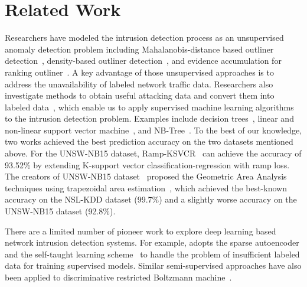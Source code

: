 \section{Related Work}
Researchers have modeled the intrusion detection process as an unsupervised
anomaly detection problem including Mahalanobis-distance based outliner detection~\cite{ComparativeAnomalyNIDS},
density-based outliner detection~\cite{LOF}, and evidence accumulation for ranking outliner~\cite{RankingOutliner}.
A key advantage of those unsupervised approaches is to address the unavailability of labeled network traffic data.
Researchers also investigate methods to obtain useful attacking data and convert them into labeled data~\cite{KDDCup, NSL-KDD, UNSW},
which enable us to apply supervised machine learning algorithms to the intrusion detection problem.
Examples include decision trees~\cite{DecisionTree}, linear and non-linear support vector machine~\cite{SVM},
and NB-Tree~\cite{NB-Tree}. To the best of our knowledge, two works achieved the best prediction accuracy on the two datasets mentioned above.
For the UNSW-NB15 dataset, Ramp-KSVCR~\cite{RampLossKSVCR} can achieve the accuracy of 93.52\% by extending K-support vector classification-regression with ramp loss. 
The creators of UNSW-NB15 dataset~\cite{UNSW} proposed the Geometric Area Analysis techniques using trapezoidal area estimation~\cite{GAA-ADS},
which achieved the best-known accuracy on the NSL-KDD dataset (99.7\%) and
a slightly worse accuracy on the UNSW-NB15 dataset (92.8\%).

There are a limited number of pioneer work to explore deep learning based network intrusion detection systems.
For example, \cite{STL-NIDS} adopts the sparse autoencoder and the self-taught learning scheme~\cite{SparseAE}
to handle the problem of insufficient labeled data for training supervised models.
Similar semi-supervised approaches have also been applied to discriminative restricted Boltzmann machine~\cite{AnomalyDetectionRBM}.
